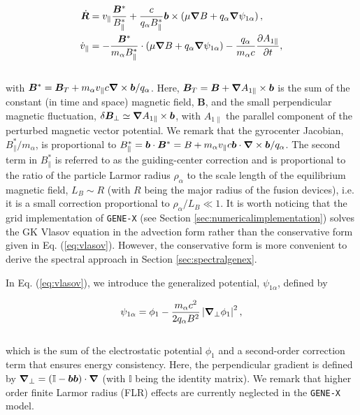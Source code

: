 \documentclass[preprint,12pt]{elsarticle}
\begin{document}
\begin{subequations} \label{eq:motions}
\begin{align}
\dot{\bm R} & = v_{\|}  \frac{\bm{B}^*}{B_{\|}^*}  + \frac{c}{q_\alpha B_{\|}^*} \bm{b} \times\left(\mu  \grad  B + q_\alpha  \grad  \psi_{1 \alpha}\right), \\
\dot v_\parallel & =  - \frac{\bm{B}^*}{m_\alpha B_{\|}^*} \cdot\left(\mu  \grad  B+q_\alpha \grad \psi_{1 \alpha}\right)  - \frac{q_\alpha}{m_\alpha c} \frac{\partial A_{1 \parallel} }{\partial t} ,
\end{align}
\end{subequations}
\\
with $\bm{B}^* =  \bm{B}_{T} + m_\alpha v_{\|} c \grad \times \bm{b} / q_\alpha$. Here, $\bm B_{T} = \bm B + \grad A_{1 \|} \times \bm{b}$ is the sum of the constant (in time and space) magnetic field, $\bm B$, and the small perpendicular magnetic fluctuation, $\delta \bm B_\perp \simeq \grad A_{1 \|} \times \bm{b}$, with $A_{1 \|}$ the parallel component of the perturbed magnetic vector potential. We remark that the gyrocenter Jacobian, $B_\parallel^* / m_\alpha$, is proportional to $B_{\parallel}^* = \bm b \cdot \bm B^* = B + m_\alpha v_{\|} c \bm b \cdot \grad \times \boldsymbol{b}  / q_\alpha$. The second term in $B_{\parallel}^*$ is referred to as the guiding-center correction and is proportional to the ratio of the particle Larmor radius $\rho_\alpha$ to the scale length of the equilibrium magnetic field, $L_B \sim R$ (with $R$ being the major radius of the fusion devices), i.e. it is a small correction proportional to $\rho_\alpha / L_B \ll 1$. It is worth noticing that the grid implementation of \verb|GENE-X| (see Section \ref{sec:numericalimplementation}) solves the GK Vlasov equation in the advection form rather than the conservative form given in Eq. (\ref{eq:vlasov}). However, the conservative form is more convenient to derive the spectral approach in Section \ref{sec:spectralgenex}. 

In Eq. (\ref{eq:vlasov}), we introduce the generalized potential, $\psi_{1 \alpha}$, defined by

\begin{align} \label{eq:psi}
\psi_{1 \alpha} = \phi_1 -  \frac{m_\alpha c^2}{2 q _\alpha  B^2} \left|  \grad_\perp \phi_1 \right|^2,
\end{align}
\\
which is the sum of the electrostatic potential $\phi_1$ and a second-order correction term that ensures energy consistency. Here, the perpendicular gradient is defined by $\grad_\perp = (\mathbb{I} - \bm b \bm b ) \cdot \grad$ (with $\mathbb{I}$ being the identity matrix). We remark that higher order finite Larmor radius (FLR) effects are currently neglected in the \verb|GENE-X| model.
\end{document}
